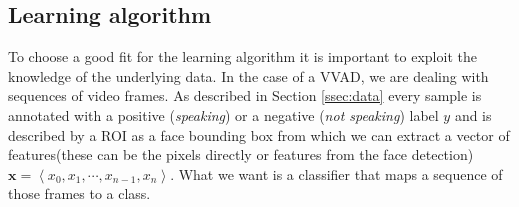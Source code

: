 \subsection{Learning algorithm}\label{ssec:algorithm}
To choose a good fit for the learning algorithm it is important to exploit the knowledge of the underlying data. In the case of a VVAD, we are dealing with sequences of video frames.
%
As described in Section \ref{ssec:data} every sample is annotated with a positive (\emph{speaking}) or a negative (\emph{not speaking}) label $y$ and is described by a  ROI as a face bounding box from which we can extract a vector of features(these can be the pixels directly or features from the face detection) $\mathbf{x} = \left\langle x_{0}, x_{1}, \cdots , x_{n-1}, x_{n} \right\rangle$. What we want is a classifier that maps a sequence of those frames to a class.
